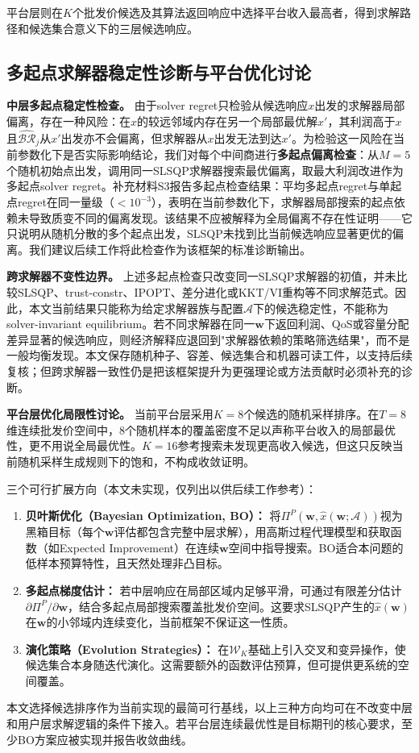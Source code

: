 \documentclass[UTF8,11pt]{ctexart}
\newcommand{\w}{\boldsymbol{w}}
\begin{document}
平台层则在$K$个批发价候选及其算法返回响应中选择平台收入最高者，得到求解路径和候选集合意义下的三层候选响应。

\subsection{多起点求解器稳定性诊断与平台优化讨论}
\label{sec:multi_start_diagnostics}

\textbf{中层多起点稳定性检查。} 由于solver regret只检验从候选响应$x$出发的求解器局部偏离，存在一种风险：在$x$的较远邻域内存在另一个局部最优解$x'$，其利润高于$x$且$\widehat{\mathcal{BR}}_j$从$x'$出发亦不会偏离，但求解器从$x$出发无法到达$x'$。为检验这一风险在当前参数化下是否实际影响结论，我们对每个中间商进行\textbf{多起点偏离检查}：从$M=5$个随机初始点出发，调用同一SLSQP求解器搜索最优偏离，取最大利润改进作为多起点solver regret。补充材料S3报告多起点检查结果：平均多起点regret与单起点regret在同一量级（$<10^{-3}$），表明在当前参数化下，求解器局部搜索的起点依赖未导致质变不同的偏离发现。该结果不应被解释为全局偏离不存在性证明——它只说明从随机分散的多个起点出发，SLSQP未找到比当前候选响应显著更优的偏离。我们建议后续工作将此检查作为该框架的标准诊断输出。

\textbf{跨求解器不变性边界。} 上述多起点检查只改变同一SLSQP求解器的初值，并未比较SLSQP、trust-constr、IPOPT、差分进化或KKT/VI重构等不同求解范式。因此，本文当前结果只能称为给定求解器族与配置$\mathcal{A}$下的候选稳定性，不能称为solver-invariant equilibrium。若不同求解器在同一$\w$下返回利润、QoS或容量分配差异显著的候选响应，则经济解释应退回到"求解器依赖的策略筛选结果"，而不是一般均衡发现。本文保存随机种子、容差、候选集合和机器可读工件，以支持后续复核；但跨求解器一致性仍是把该框架提升为更强理论或方法贡献时必须补充的诊断。

\textbf{平台层优化局限性讨论。} 当前平台层采用$K=8$个候选的随机采样排序。在$T=8$维连续批发价空间中，8个随机样本的覆盖密度不足以声称平台收入的局部最优性，更不用说全局最优性。$K=16$参考搜索未发现更高收入候选，但这只反映当前随机采样生成规则下的饱和，不构成收敛证明。

三个可行扩展方向（本文未实现，仅列出以供后续工作参考）：
\begin{enumerate}[leftmargin=2em]
  \item \textbf{贝叶斯优化（Bayesian Optimization, BO）：} 将$\Pi^P(\w,\widehat x(\w;\mathcal{A}))$视为黑箱目标（每个$\w$评估都包含完整中层求解），用高斯过程代理模型和获取函数（如Expected Improvement）在连续$\w$空间中指导搜索。BO适合本问题的低样本预算特性，且天然处理非凸目标。
  \item \textbf{多起点梯度估计：} 若中层响应在局部区域内足够平滑，可通过有限差分估计$\partial\Pi^P/\partial\w$，结合多起点局部搜索覆盖批发价空间。这要求SLSQP产生的$\widehat x(\w)$在$\w$的小邻域内连续变化，当前框架不保证这一性质。
  \item \textbf{演化策略（Evolution Strategies）：} 在$\mathcal{W}_K$基础上引入交叉和变异操作，使候选集合本身随迭代演化。这需要额外的函数评估预算，但可提供更系统的空间覆盖。
\end{enumerate}
本文选择候选排序作为当前实现的最简可行基线，以上三种方向均可在不改变中层和用户层求解逻辑的条件下接入。若平台层连续最优性是目标期刊的核心要求，至少BO方案应被实现并报告收敛曲线。
\end{document}
